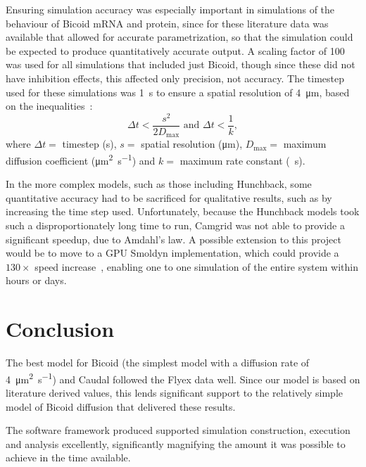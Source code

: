 \documentclass[11pt,a4paper,twocolumn]{article}
\begin{document}
Ensuring simulation accuracy was especially important in simulations of the behaviour of Bicoid mRNA and protein, since for these literature data was available that allowed for accurate parametrization, so that the simulation could be expected to produce quantitatively accurate output. A scaling factor of \num{100} was used for all simulations that included just Bicoid, though since these did not have inhibition effects, this affected only precision, not accuracy. The timestep used for these simulations was \SI{1}{s} to ensure a spatial resolution of \SI{4}{\micro\metre}, based on the inequalities~\cite{Andrews2011}:
\begin{displaymath}
\Delta t < \frac{s^2}{2D_\text{max}} \text{ and } \Delta t < \frac{1}{k},
\end{displaymath}
where \(\Delta t =\) timestep (\si{\second}), \(s =\) spatial resolution (\si{\micro\metre}), \(D_\text{max} =\) maximum diffusion coefficient (\si{\micro\metre\squared\per\second}) and \(k = \) maximum rate constant (\si{\per\second}).

In the more complex models, such as those including Hunchback, some quantitative accuracy had to be sacrificed for qualitative results, such as by increasing the time step used. Unfortunately, because the Hunchback models took such a disproportionately long time to run, Camgrid was not able to provide a significant speedup, due to Amdahl’s law. A possible extension to this project would be to move to a GPU Smoldyn implementation, which could provide a \(130 \times\)  speed increase~\cite{Dematte2010}, enabling one to one simulation of the entire system within hours or days.

\raggedbottom
\section{Conclusion}
The best model for Bicoid (the simplest model with a diffusion rate of \SI{4}{\micro\metre\squared\per\second}) and Caudal followed the Flyex data well. Since our model is based on literature derived values, this lends significant support to the relatively simple model of Bicoid diffusion that delivered these results. 

\nopagebreak
The software framework produced supported simulation construction, execution and analysis excellently, significantly magnifying the amount it was possible to achieve in the time available.

\nocite{*}
\clearpage


\end{document}
